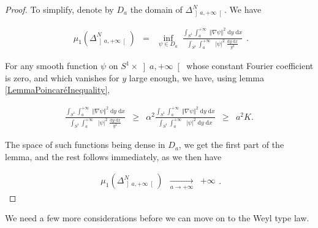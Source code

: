 \documentclass{jams-l}
\theoremstyle{definition}
\theoremstyle{remark}
\numberwithin{equation}{section}
\begin{document}
        \begin{proof}
        
            To simplify, denote by $D_a$ the domain of $\Delta^N_{\left] a, +\infty \right[}$. We have
            
            \[ \begin{array}{lll}
                    \mu_1 \left( \Delta^N_{\left] a, +\infty \right[} \right) & = & \inf\limits_{\psi \in D_a} \; \frac{\int_{S^1} \int_{a_{\phantom{a}}}^{+ \infty} \; \left \Vert \nabla \psi \right \Vert^2 \; \mathrm{d}y \; \mathrm{d}x}{\int_{S^1} \int_a^{+ \infty^{\phantom{a}}} \; \left \vert \psi \right \vert^2 \; \frac{\mathrm{d}y \; \mathrm{d}x}{y^2}}
                \end{array} . \]
            
            \noindent For any smooth function $\psi$ on $S^1 \times \left] a, + \infty \right[$ whose constant Fourier coefficient is zero, and which vanishes for $y$ large enough, we have, using lemma \ref{LemmaPoincaréInequality},
            
            \[ \begin{array}{lllll}
                    \frac{\int_{S^1} \int_{a_{\phantom{a}}}^{+ \infty} \; \left \Vert \nabla \psi \right \Vert^2 \; \mathrm{d}y \; \mathrm{d}x}{\int_{S^1} \int_a^{+ \infty^{\phantom{a}}} \; \left \vert \psi \right \vert^2 \; \frac{\mathrm{d}y \; \mathrm{d}x}{y^2}} & \geqslant & \alpha^2 \frac{\int_{S^1} \int_{a_{\phantom{a}}}^{+ \infty} \; \left \Vert \nabla \psi \right \Vert^2 \; \mathrm{d}y \; \mathrm{d}x}{\int_{S^1} \int_a^{+ \infty^{\phantom{a}}} \; \left \vert \psi \right \vert^2 \; \mathrm{d}y \; \mathrm{d}x} & \geqslant & a^2 K.
                \end{array} \]
            
            \noindent The space of such functions being dense in $D_a$, we get the first part of the lemma, and the rest follows immediately, as we then have 
            
            \[ \begin{array}{lll}
                    \mu_1 \left( \Delta^N_{\left] a, +\infty \right[} \right) & \underset{a \rightarrow + \infty}{\longrightarrow} & + \infty
                \end{array} . \]
        
        \end{proof}
        
        We need a few more considerations before we can move on to the Weyl type law.
        
\end{document}
